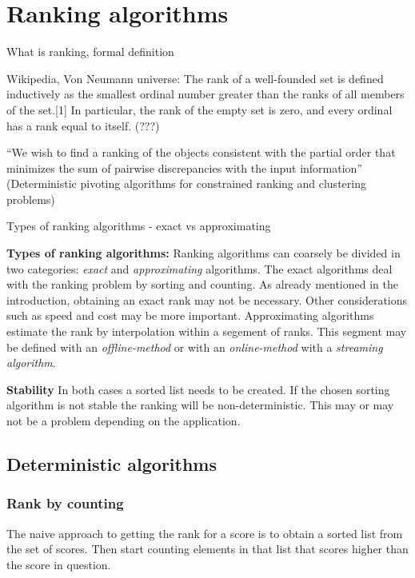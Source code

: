\chapter{Ranking algorithms}

\begin{shaded}
  
  What is ranking, formal definition
 
Wikipedia, Von Neumann universe: The rank of a well-founded set is defined inductively as the smallest ordinal number greater than the ranks of all members of the set.[1] In particular, the rank of the empty set is zero, and every ordinal has a rank equal to itself. (???)

``We wish to find a ranking of the objects consistent with the
partial order that minimizes the sum of pairwise discrepancies
with the input information'' (Deterministic pivoting algorithms
for constrained ranking and clustering problems)

Types of ranking algorithms - exact vs approximating
 
\end{shaded}



\textbf{Types of ranking algorithms:} Ranking algorithms can coarsely be divided in two categories: \emph{exact} and \emph{approximating} algorithms. The exact algorithms deal with the ranking problem by sorting and counting. As already mentioned in the introduction, obtaining an exact rank may not be necessary. Other considerations such as speed and cost may be more important. Approximating algorithms estimate the rank by interpolation within a segement of ranks. This segment may be defined with an \emph{offline-method} or with an \emph{online-method} with a \emph{streaming algorithm}.  

\textbf{Stability} In both cases a sorted list needs to be created. If the chosen sorting algorithm is not stable the ranking will be non-deterministic. This may or may not be a problem depending on the application. 


\section{Deterministic algorithms}

\subsection{Rank by counting}

The naive approach to getting the rank for a score is to obtain a sorted list from the set of scores. Then start counting elements in that list that scores higher than the score in question.

